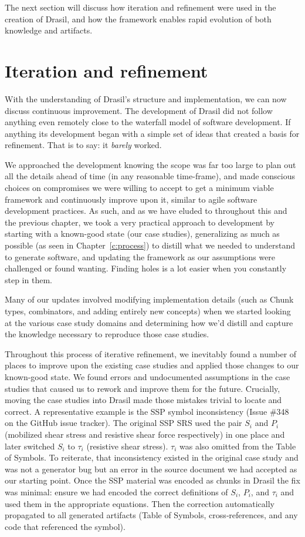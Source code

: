 The next section will discuss how iteration and refinement were used in the 
creation of Drasil, and how the framework enables rapid evolution of both 
knowledge and artifacts.

\section{Iteration and refinement}
\label{sec:iterefine}

With the understanding of Drasil's structure and implementation, we can now 
discuss continuous improvement. The development of Drasil did not follow 
anything even remotely close to the waterfall model of software development. If 
anything its development began with a simple set of ideas that created a basis 
for refinement. That is to say: it \emph{barely} worked.

We approached the development knowing the scope was far too large to plan out 
all the details ahead of time (in any reasonable time-frame), and made 
conscious choices on compromises we were willing to accept to get a minimum 
viable framework and continuously improve upon it, similar to agile software 
development practices. As such, and as we have eluded to throughout this and 
the previous chapter, we took a very practical approach to development by 
starting with a known-good state (our case studies), generalizing as much as 
possible (as seen in Chapter~\ref{c:process}) to distill what we needed to 
understand to generate software, and updating the framework as our assumptions 
were challenged or found wanting. Finding holes is a lot easier when you 
constantly step in them.

Many of our updates involved modifying implementation details (such as Chunk 
types, combinators, and adding entirely new concepts) when we started looking 
at the various case study domains and determining how we'd distill and capture 
the knowledge necessary to reproduce those case studies.

Throughout this process of iterative refinement, we inevitably found a number 
of places to improve upon the existing case studies and applied those changes 
to our known-good state. We found errors and undocumented assumptions in the 
case studies that caused us to rework and improve them for the future. 
Crucially, moving the case studies into Drasil made those mistakes trivial to 
locate and correct. A representative example is the SSP symbol inconsistency 
(Issue \#348 on the GitHub issue tracker). The original SSP SRS used the pair 
$S_i$ and $P_i$ (mobilized shear stress and resistive shear force respectively) 
in one place and later switched $S_i$ to $\tau_i$ (resistive shear stress). 
$\tau_i$ was also omitted from the Table of Symbols. To reiterate, that 
inconsistency existed in the original case study and was not a generator bug 
but an error in the source document we had accepted as our starting point. Once 
the SSP material was encoded as chunks in Drasil the fix was minimal: ensure we 
had encoded the correct definitions of $S_i$, $P_i$, and $\tau_i$ and used them 
in the appropriate equations. Then the correction automatically propagated to 
all generated artifacts (Table of Symbols, cross‑references, and any code that 
referenced the symbol).

